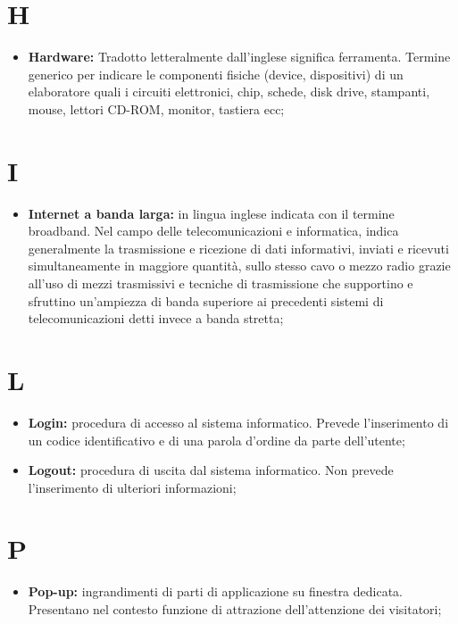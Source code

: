 	\section*{\Huge H} %
		\begin{itemize}
			\item \textbf{Hardware:} Tradotto letteralmente dall'inglese significa ferramenta. Termine generico per indicare le componenti fisiche (device, dispositivi) di un elaboratore quali i circuiti elettronici, chip, schede, disk drive, stampanti, mouse, lettori CD-ROM, monitor, tastiera ecc;
		\end{itemize}


	\section*{\Huge I} %
		\begin{itemize}
			\item \textbf{Internet a banda larga:} in lingua inglese indicata con il termine broadband. Nel campo delle telecomunicazioni e informatica, indica generalmente la trasmissione e ricezione di dati informativi, inviati e ricevuti simultaneamente in maggiore quantità, sullo stesso cavo o mezzo radio grazie all'uso di mezzi trasmissivi e tecniche di trasmissione che supportino e sfruttino un'ampiezza di banda superiore ai precedenti sistemi di telecomunicazioni detti invece a banda stretta;
		\end{itemize}


	\section*{\Huge L} %
		\begin{itemize}
			\item \textbf{Login:} procedura di accesso al sistema informatico. Prevede l'inserimento di un codice identificativo e di una parola d'ordine da parte dell'utente;
			\item \textbf{Logout:} procedura di uscita dal sistema informatico. Non prevede l'inserimento di ulteriori informazioni;
		\end{itemize}


	\section*{\Huge P} %
		\begin{itemize}
			\item \textbf{Pop-up:} ingrandimenti di parti di applicazione su finestra dedicata. Presentano nel contesto funzione di attrazione dell'attenzione dei visitatori;
		\end{itemize}


